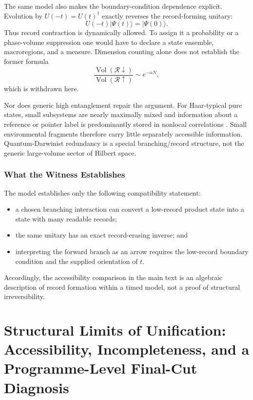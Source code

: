 \documentclass[12pt,a4paper,openany]{book}
\begin{document}
The same model also makes the boundary-condition dependence explicit.  Evolution by $U(-t)=U(t)^\dagger$ exactly reverses the record-forming unitary:
\begin{equation}
U(-t)|\Psi(t)\rangle=|\Psi(0)\rangle.
\end{equation}
Thus record contraction is dynamically allowed.  To assign it a probability or a phase-volume suppression one would have to declare a state ensemble, macroregions, and a measure.  Dimension counting alone does not establish the former formula
\begin{equation}
\frac{\operatorname{Vol}(\mathcal R\downarrow)}
{\operatorname{Vol}(\mathcal R\uparrow)}\sim e^{-\alpha N},
\end{equation}
which is withdrawn here.

Nor does generic high entanglement repair the argument.  For Haar-typical pure states, small subsystems are nearly maximally mixed and information about a reference or pointer label is predominantly stored in nonlocal correlations \cite{Page1993,HaydenPreskill2007}.  Small environmental fragments therefore carry little separately accessible information.  Quantum-Darwinist redundancy is a special branching/record structure, not the generic large-volume sector of Hilbert space.

\subsection{What the Witness Establishes}

The model establishes only the following compatibility statement:
\begin{itemize}
    \item a chosen branching interaction can convert a low-record product state into a state with many readable records;
    \item the same unitary has an exact record-erasing inverse; and
    \item interpreting the forward branch as an arrow requires the low-record boundary condition and the supplied orientation of $t$.
\end{itemize}
Accordingly, the accessibility comparison in the main text is an algebraic description of record formation within a timed model, not a proof of structural irreversibility.

\chapter{Structural Limits of Unification: Accessibility, Incompleteness, and a Programme-Level Final-Cut Diagnosis}
\label{H-chap:paperG}
\end{document}
